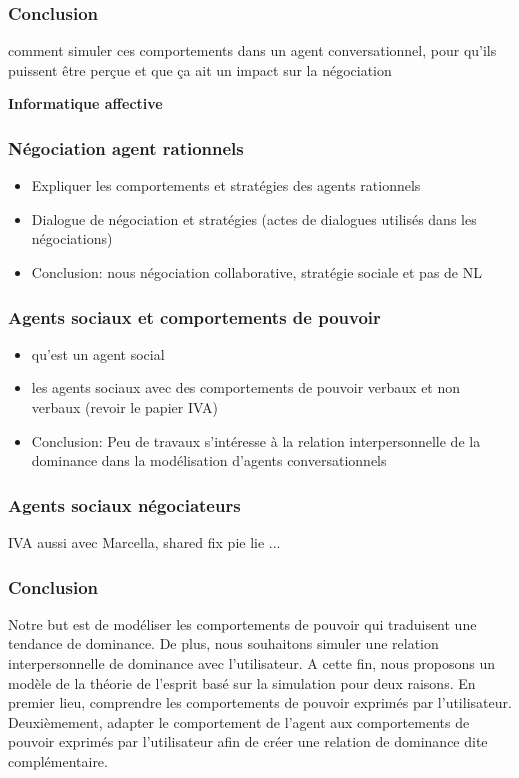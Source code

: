 \documentclass [french]{article}
\begin{document}
			\subsubsection{Conclusion}
			comment simuler ces comportements dans un agent conversationnel, pour qu'ils puissent être perçue et que ça ait un impact sur la négociation
			
		
			\textbf{Informatique affective}
			\subsubsection{Négociation agent rationnels}
					\begin{itemize}
							\item Expliquer les comportements et stratégies des agents rationnels 
							\item Dialogue de négociation et stratégies (actes de dialogues utilisés dans les négociations)
							\item Conclusion: nous  négociation collaborative, stratégie sociale et pas de NL
					\end{itemize}
			
			\subsubsection{Agents sociaux et comportements de pouvoir}
				\begin{itemize}
					\item qu'est un agent social 
					\item les agents sociaux avec des comportements de pouvoir verbaux et non verbaux (revoir le papier IVA)
					\item Conclusion: Peu de travaux s'intéresse à la relation interpersonnelle de la dominance dans la modélisation d'agents conversationnels
					
				\end{itemize}
				
			\subsubsection{Agents sociaux négociateurs}
				IVA aussi avec Marcella, shared fix pie lie ...
			\subsubsection{Conclusion}
		
			Notre but est de modéliser les comportements de pouvoir qui traduisent une tendance de dominance. De plus, nous souhaitons simuler une relation interpersonnelle de dominance avec l'utilisateur. A cette fin, nous proposons un modèle de la théorie de l'esprit basé sur la simulation  pour deux raisons. En premier lieu, comprendre les comportements de pouvoir exprimés par l'utilisateur. Deuxièmement, adapter le comportement de l'agent aux comportements de pouvoir exprimés par l'utilisateur afin de créer une relation de dominance dite complémentaire. 	
			
\end{document}
